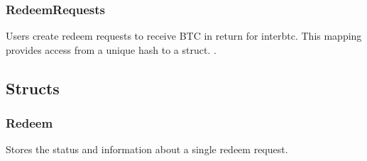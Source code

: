 \documentclass[a4paper,10pt,english]{sphinxmanual}
\begin{document}
\subsubsection{RedeemRequests}
\label{\detokenize{spec/redeem:redeemrequests}}
Users create redeem requests to receive BTC in return for interbtc. This mapping provides access from a unique hash  to a  struct. .


\subsection{Structs}
\label{\detokenize{spec/redeem:structs}}

\subsubsection{Redeem}
\label{\detokenize{spec/redeem:id4}}
Stores the status and information about a single redeem request.
\end{document}
